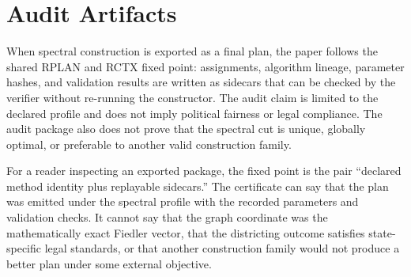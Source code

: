 \section{Audit Artifacts}

When spectral construction is exported as a final plan, the paper follows the
shared RPLAN and RCTX fixed point: assignments, algorithm lineage, parameter
hashes, and validation results are written as sidecars that can be checked by
the verifier without re-running the constructor. The audit claim is limited to
the declared profile and does not imply political fairness or legal compliance.
The audit package also does not prove that the spectral cut is unique,
globally optimal, or preferable to another valid construction family.

For a reader inspecting an exported package, the fixed point is the pair
``declared method identity plus replayable sidecars.'' The certificate can say
that the plan was emitted under the spectral profile with the recorded
parameters and validation checks. It cannot say that the graph coordinate was
the mathematically exact Fiedler vector, that the districting outcome satisfies
state-specific legal standards, or that another construction family would not
produce a better plan under some external objective.

